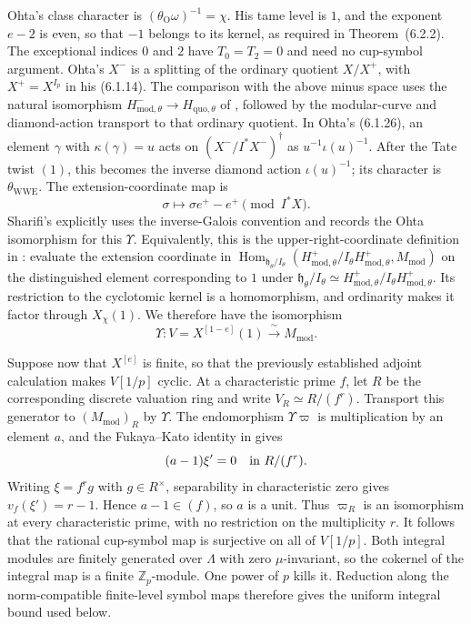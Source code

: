Ohta's class character is
$(\theta_{\mathrm O}\omega)^{-1}=\chi$.  His tame level is $1$,
and the exponent $e-2$ is even, so that $-1$ belongs to its kernel,
as required in Theorem~(6.2.2).  The exceptional indices $0$ and $2$
have $T_0=T_2=0$ and need no cup-symbol argument.  Ohta's $X^-$ is a
splitting of the ordinary quotient $X/X^+$, with $X^+=X^{I_p}$
in his (6.1.14).  The comparison with the above minus space uses the
natural isomorphism $H^-_{\mathrm{mod},\theta}\to H_{\mathrm{quo},\theta}$
of \cite[Theorem~3.4.1 and Corollary~3.4.2]{WWEPseudo}, followed by the
modular-curve and diamond-action transport to that ordinary quotient.
In Ohta's (6.1.26), an element $\gamma$ with $\kappa(\gamma)=u$ acts on
$(X^-/I^*X^-)^\dagger$ as $u^{-1}\iota(u)^{-1}$.  After the Tate twist $(1)$,
this becomes the inverse diamond action $\iota(u)^{-1}$; its character
is $\theta_{\mathrm{WWE}}$.  The extension-coordinate map is
\[
 \sigma\longmapsto \sigma e^+-e^+\pmod{I^*X}.
\]
Sharifi's \cite[pp.~3 and 13--14]{SharifiProgram} explicitly uses the inverse-Galois convention and records the
Ohta isomorphism for this $\Upsilon$.  Equivalently, this is the
upper-right-coordinate definition in \cite[\S8.1]{WWEPseudo}:
evaluate the extension coordinate in
$\operatorname{Hom}_{\mathfrak h_\theta/I_\theta}
 (H^+_{\mathrm{mod},\theta}/I_\theta H^+_{\mathrm{mod},\theta},
 M_{\mathrm{mod}})$ on the distinguished element corresponding to
$1$ under $\mathfrak h_\theta/I_\theta\simeq
H^+_{\mathrm{mod},\theta}/I_\theta H^+_{\mathrm{mod},\theta}$.
Its restriction to the cyclotomic kernel is a homomorphism, and
ordinarity makes it factor through $X_\chi(1)$.
We therefore have the isomorphism
\[
 \Upsilon: V=X^{[1-e]}(1)\xrightarrow{\ \sim\ }M_{\mathrm{mod}}.
\]

Suppose now that $X^{[e]}$ is finite, so that the previously established
adjoint calculation makes $V[1/p]$ cyclic.  At a characteristic prime
$f$, let $R$ be the corresponding discrete valuation ring and write
$V_R\simeq R/(f^r)$.  Transport this generator to
$(M_{\mathrm{mod}})_R$ by $\Upsilon$.
The endomorphism $\Upsilon\varpi$ is multiplication by an element $a$,
and the Fukaya--Kato identity in
\cite[Theorem~5.21]{SharifiFK} gives
\[
 (a-1)\xi'=0\quad\hbox{in }R/(f^r).
\]
Writing $\xi=f^r g$ with $g\in R^\times$, separability in
characteristic zero gives $v_f(\xi')=r-1$.  Hence $a-1\in(f)$,
so $a$ is a unit.  Thus $\varpi_R$ is an isomorphism at every
characteristic prime, with no restriction on the multiplicity $r$.
It follows that the rational cup-symbol map is surjective on all of
$V[1/p]$. Both integral modules are finitely generated over $\Lambda$
with zero $\mu$-invariant, so the cokernel of the integral map
is a finite $\mathbb Z_p$-module. One power of $p$ kills it.
Reduction along the norm-compatible finite-level symbol maps
therefore gives the uniform integral bound used below.

